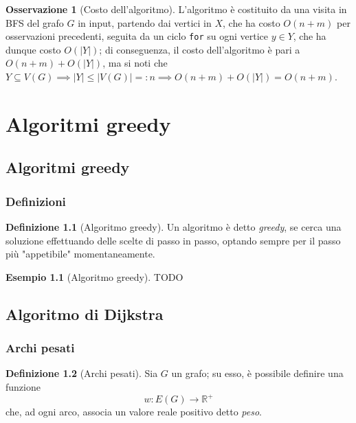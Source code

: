 \documentclass[14pt]{extreport}
\theoremstyle{definition}
\newtheorem{definition}{Definizione}[subsection]
\theoremstyle{definition}
\newtheorem{remark}{Osservazione}[subsection]
\newtheorem{example}{Esempio}[subsection]
\begin{document}
\begin{remark}[Costo dell'algoritmo]
    L'algoritmo è costituito da una visita in BFS del grafo $G$ in input, partendo dai vertici in $X$, che ha costo $O(n + m)$ per osservazioni precedenti, seguita da un ciclo \texttt{for} su ogni vertice $y \in Y$, che ha dunque costo $O(|Y|)$; di conseguenza, il costo dell'algoritmo è pari a $O(n + m) + O(|Y|)$, ma si noti che $Y \subseteq V(G) \implies |Y| \le |V(G)| =: n \implies O(n + m) + O(|Y|) = O(n + m)$.
\end{remark}

\chapter{Algoritmi greedy}

\section{Algoritmi greedy}

\subsection{Definizioni}

\begin{definition}[Algoritmo greedy]
    Un algoritmo è detto \textit{greedy}, se cerca una soluzione effettuando delle scelte di passo in passo, optando sempre per il passo più "appetibile" momentaneamente.
\end{definition}

\begin{example}[Algoritmo greedy]
    TODO
\end{example}

\section{Algoritmo di Dijkstra}

\subsection{Archi pesati}

\begin{definition}[Archi pesati]
    Sia $G$ un grafo; su esso, è possibile definire una funzione $$w: E(G) \rightarrow \mathbb{R}^+$$ che, ad ogni arco, associa un valore reale positivo detto \textit{peso}.
\end{definition}
\end{document}
